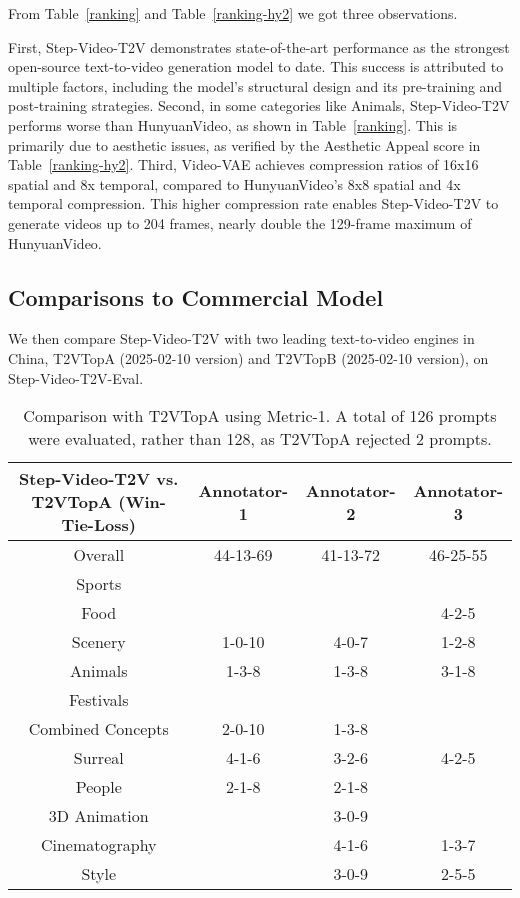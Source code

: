 From Table~\ref{ranking} and Table~\ref{ranking-hy2} we got three observations.

First, Step-Video-T2V demonstrates state-of-the-art performance as the strongest open-source text-to-video generation model to date. This success is attributed to multiple factors, including the model’s structural design and its pre-training and post-training strategies.
Second, in some categories like Animals, Step-Video-T2V performs worse than HunyuanVideo, as shown in Table~\ref{ranking}. This is primarily due to aesthetic issues, as verified by the Aesthetic Appeal score in Table~\ref{ranking-hy2}.
Third, Video-VAE achieves compression ratios of 16x16 spatial and 8x temporal, compared to HunyuanVideo’s 8x8 spatial and 4x temporal compression. This higher compression rate enables Step-Video-T2V to generate videos up to 204 frames, nearly double the 129-frame maximum of HunyuanVideo.

\subsection{Comparisons to Commercial Model}
We then compare Step-Video-T2V with two leading text-to-video engines in China, T2VTopA (2025-02-10 version) and T2VTopB (2025-02-10 version), on Step-Video-T2V-Eval.


\begin{table}[ht]\scriptsize
\centering
\begin{tabular}{c|c|c|c}
\hline
Step-Video-T2V vs. T2VTopA (Win-Tie-Loss) & Annotator-1  & Annotator-2 & Annotator-3 \\
\hline
\hline
Overall & 44-13-69 & 41-13-72 & 46-25-55 \\
\hline
\hline
Sports & \cellcolor{green!20}{6-2-4} & \cellcolor{green!20}{7-0-5} & \cellcolor{green!20}{7-3-2} \\
\hline
Food & \cellcolor{green!20}{5-2-4} & \cellcolor{green!20}{6-1-4} & 4-2-5 \\
\hline
Scenery & 1-0-10 & 4-0-7 & 1-2-8 \\
\hline
Animals & 1-3-8 & 1-3-8 & 3-1-8 \\
\hline
Festivals & \cellcolor{green!20}{6-2-3} & \cellcolor{green!20}{7-2-2} & \cellcolor{green!20}{5-3-3} \\
\hline
Combined Concepts & 2-0-10 & 1-3-8 & \cellcolor{green!20}{8-0-4} \\
\hline
Surreal & 4-1-6 & 3-2-6 & 4-2-5 \\
\hline
People & 2-1-8 & 2-1-8 & \cellcolor{green!20}{6-1-4} \\
\hline
3D Animation & \cellcolor{yellow!20}{6-0-6} & 3-0-9 & \cellcolor{green!20}{5-3-4} \\
\hline
Cinematography & \cellcolor{yellow!20}{5-1-5} & 4-1-6 & 1-3-7 \\
\hline
Style & \cellcolor{green!20}{6-1-5} & 3-0-9 & 2-5-5 \\
\hline
\end{tabular}
\caption{Comparison with T2VTopA using Metric-1. A total of 126 prompts were evaluated, rather than 128, as T2VTopA rejected 2 prompts.} 
\label{ranking-hailuo}
\end{table}



